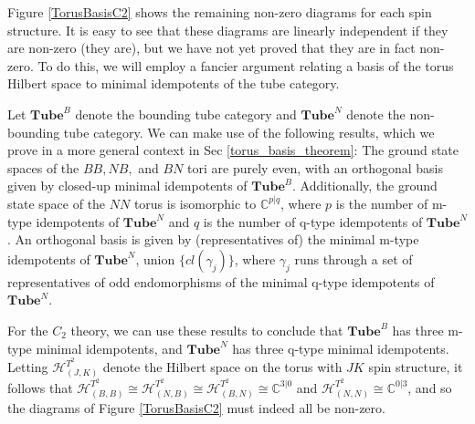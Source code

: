 \documentclass[12pt,a4paper]{article}
\newcommand{\cc}{\mathbb{C}}
\newcommand{\mch}{\mathcal{H}}
\newcommand{\tube}{\textbf{Tube}}
\begin{document}
Figure \ref{TorusBasisC2} shows the remaining non-zero diagrams for each spin structure.
It is easy to see that these diagrams are linearly independent if they are non-zero (they are), but we have not yet proved that they are in fact non-zero.
To do this, we will employ a fancier argument relating a basis of the torus Hilbert space to minimal idempotents of the tube category.

Let $\tube^B$ denote the bounding tube category and $\tube^N$ denote the non-bounding tube category.
We can make use of the following results, which we prove in a more general context in Sec \ref{torus_basis_theorem}:
The ground state spaces of the ${BB}, {NB},$ and ${BN}$ tori are purely even, with an orthogonal basis given by closed-up minimal idempotents of $\tube^B$.
Additionally, the ground state space of the $NN$ torus is isomorphic to $\cc^{p|q}$, where $p$ is the number of m-type idempotents of $\tube^N$
and $q$ is the number of q-type idempotents of $\tube^N$.
An orthogonal basis is given by (representatives of) the minimal m-type idempotents of $\tube^N$,
union $\{cl(\gamma_j)\}$,
where $\gamma_j$ runs through a set of representatives of odd endomorphisms of the minimal q-type idempotents of $\tube^N$.

For the $C_2$ theory, we can use these results to conclude that $\tube^B$ has three m-type minimal idempotents, and $\tube^N$ has three q-type minimal idempotents.
Letting $\mch^{T^2}_{(J,K)}$ denote the Hilbert space on the torus with $JK$ spin structure, it follows that $\mch^{T^2}_{(B,B)} \cong \mch^{T^2}_{(N,B)} \cong \mch^{T^2}_{(B,N)} \cong \cc^{3|0}$ and
$\mch^{T^2}_{(N,N)} \cong \cc^{0|3}$,
and so the diagrams of Figure \ref{TorusBasisC2} must indeed all be non-zero.
\end{document}
